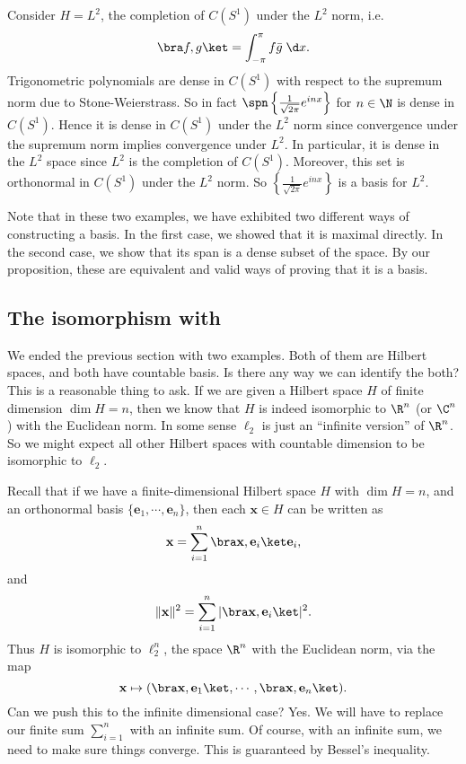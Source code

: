 \documentclass[a4paper]{article}
\begin{document}
\begin{eg}
  Consider $H = L^2$, the completion of $C(S^1)$ under the $L^2$ norm, i.e.
  \[
    \bra f, g\ket = \int_{-\pi}^\pi f\bar{g}\;\d x.
  \]
  Trigonometric polynomials are dense in $C(S^1)$ with respect to the supremum norm due to Stone-Weierstrass. So in fact $\spn \left\{\frac{1}{\sqrt{2\pi}}e^{inx}\right\}$ for $n \in \N$ is dense in $C(S^1)$. Hence it is dense in $C(S^1)$ under the $L^2$ norm since convergence under the supremum norm implies convergence under $L^2$. In particular, it is dense in the $L^2$ space since $L^2$ is the completion of $C(S^1)$. Moreover, this set is orthonormal in $C(S^1)$ under the $L^2$ norm. So $\left\{\frac{1}{\sqrt{2\pi}} e^{inx}\right\}$ is a basis for $L^2$.
\end{eg}
Note that in these two examples, we have exhibited two different ways of constructing a basis. In the first case, we showed that it is maximal directly. In the second case, we show that its span is a dense subset of the space. By our proposition, these are equivalent and valid ways of proving that it is a basis.

\subsection{The isomorphism with }
We ended the previous section with two examples. Both of them are Hilbert spaces, and both have countable basis. Is there any way we can identify the both? This is a reasonable thing to ask. If we are given a Hilbert space $H$ of finite dimension $\dim H = n$, then we know that $H$ is indeed isomorphic to $\R^n$ (or $\C^n$) with the Euclidean norm. In some sense $\ell_2$ is just an ``infinite version'' of $\R^n$. So we might expect all other Hilbert spaces with countable dimension to be isomorphic to $\ell_2$.

Recall that if we have a finite-dimensional Hilbert space $H$ with $\dim H = n$, and an orthonormal basis $\{\mathbf{e}_1, \cdots, \mathbf{e}_n\}$, then each $\mathbf{x} \in H$ can be written as
\[
  \mathbf{x} = \sum_{i = 1}^n \bra \mathbf{x}, \mathbf{e}_i\ket \mathbf{e}_i,
\]
and
\[
  \|\mathbf{x}\|^2 = \sum_{i = 1}^n |\bra \mathbf{x}, \mathbf{e}_i\ket|^2.
\]
Thus $H$ is isomorphic to $\ell_2^n$, the space $\R^n$ with the Euclidean norm, via the map
\[
  \mathbf{x} \mapsto (\bra \mathbf{x}, \mathbf{e}_1\ket, \cdots, \bra \mathbf{x}, \mathbf{e}_n\ket).
\]
Can we push this to the infinite dimensional case? Yes. We will have to replace our finite sum $\sum_{i = 1}^n$ with an infinite sum. Of course, with an infinite sum, we need to make sure things converge. This is guaranteed by Bessel's inequality.
\end{document}
